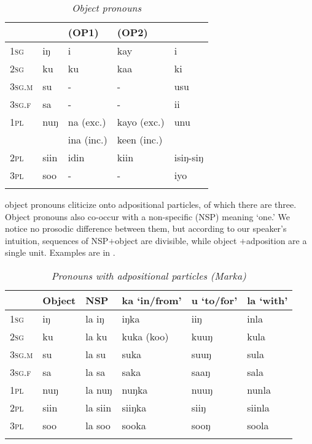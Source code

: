 \documentclass[output=paper]{../langsci/langscibook}
\begin{document}
 \begin{table}
 	\caption{\textit{Object pronouns}}
 	\label{tab:1:Object pronouns}
 	\begin{tabularx}{\textwidth}{Xllll} 
 		\lsptoprule
 		& \ili{Marka}  & \ili{Somali} (OP1) & \ili{Somali} (OP2) & \ili{Maay}   \\ 
 		\midrule
 		1\textsc{sg} & iŋ & i & kay & i \\
 		2\textsc{sg} & ku  & ku & kaa  & ki  \\
 		3\textsc{sg.m} & su & - & - & usu \\
 		3\textsc{sg.f} & sa & - & - & ii \\
 		1\textsc{pl} & nuŋ & na (exc.) & kayo (exc.) & unu \\
 		& & ina (inc.) & keen (inc.) &  \\
 		2\textsc{pl} & siin & idin & kiin & isiŋ-siŋ  \\
 		3\textsc{pl} & soo & - & - & iyo \\
 		\lspbottomrule
 	\end{tabularx}
 \end{table}
 
  object pronouns cliticize onto adpositional particles, of which there are three. Object pronouns also co-occur with a non-specific  (NSP) meaning `one.' We notice no prosodic difference between them, but according to our speaker's intuition, sequences of NSP$+$object  are divisible, while object $+$adposition are a single unit. Examples are in .\\
 
\vspace{12pt} 
\begin{table}
 	\caption{\textit{Pronouns with adpositional particles (Marka)}}
 	\label{tab:1:Pronouns Adpositions}
 	\begin{tabularx}{\textwidth}{Xlllll} 
 		\lsptoprule
 		& Object \isi{pronoun} & NSP  & ka `in/from' & u `to/for' & la `with' \\ 
 		\midrule
 		1\textsc{sg} & iŋ & la iŋ & iŋka & iiŋ & inla \\
 		2\textsc{sg} & ku  & la ku & kuka (koo)  & kuuŋ & kula  \\
 		3\textsc{sg.m} & su & la su & suka & suuŋ & sula \\
 		3\textsc{sg.f} & sa & la sa & saka & saaŋ & sala \\
 		1\textsc{pl} & nuŋ & la nuŋ & nuŋka & nuuŋ & nunla \\
 		2\textsc{pl} & siin & la siin & siiŋka & siiŋ & siinla  \\
 		3\textsc{pl} & soo & la soo & sooka & sooŋ & soola \\
 		\lspbottomrule
 	\end{tabularx}
 \end{table}
 
\end{document}
